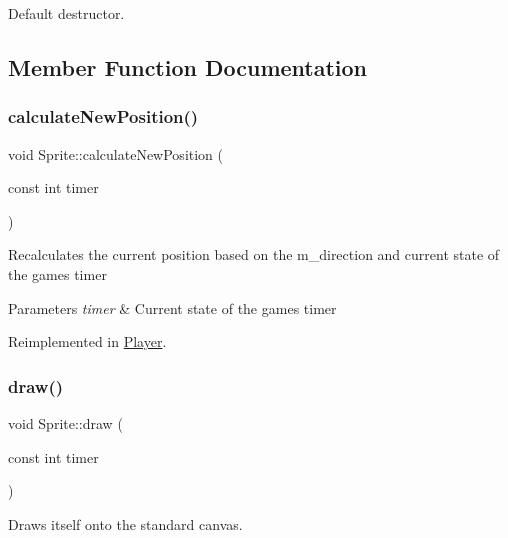 Default destructor. 



\subsection{Member Function Documentation}
\mbox{\label{classSprite_a280f80ec30e7d237e3d1380dab27dd31}} 
\subsubsection{\texorpdfstring{calculate\+New\+Position()}{calculateNewPosition()}}
{\footnotesize\ttfamily void Sprite\+::calculate\+New\+Position (\begin{DoxyParamCaption}\item[{const int}]{timer }\end{DoxyParamCaption})\hspace{0.3cm}{\ttfamily [virtual]}}

Recalculates the current position based on the m\+\_\+direction and current state of the game\textquotesingle{}s timer


\begin{DoxyParams}{Parameters}
{\em timer} & Current state of the game\textquotesingle{}s timer \\
\hline
\end{DoxyParams}


Reimplemented in \hyperlink{classPlayer_a574659d927fef4b34544b728c1631433}{Player}.

\mbox{\label{classSprite_aa41512617e8a1626bade15cbbdfb3f79}} 
\subsubsection{\texorpdfstring{draw()}{draw()}}
{\footnotesize\ttfamily void Sprite\+::draw (\begin{DoxyParamCaption}\item[{const int}]{timer }\end{DoxyParamCaption})\hspace{0.3cm}{\ttfamily [virtual]}}

Draws itself onto the standard canvas.


